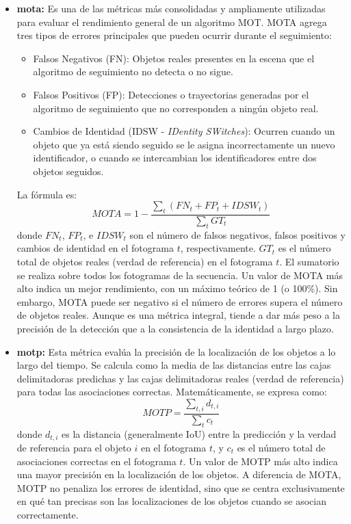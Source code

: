 \documentclass[11pt,spanish,listoffigures,listoftables]{tfgetsinf}
\begin{document}
\begin{itemize}
   \item \textbf{\gls{mota}\cite{4479472}:} Es una de las métricas más consolidadas y ampliamente utilizadas para evaluar el rendimiento general de un algoritmo MOT. MOTA agrega tres tipos de errores principales que pueden ocurrir durante el seguimiento:
   \begin{itemize}
     \item Falsos Negativos (FN): Objetos reales presentes en la escena que el algoritmo de seguimiento no detecta o no sigue.
     \item Falsos Positivos (FP): Detecciones o trayectorias generadas por el algoritmo de seguimiento que no corresponden a ningún objeto real.
     \item Cambios de Identidad (IDSW - \textit{IDentity SWitches}): Ocurren cuando un objeto que ya está siendo seguido se le asigna incorrectamente un nuevo identificador, o cuando se intercambian los identificadores entre dos objetos seguidos.
   \end{itemize}
   La fórmula es:
   \begin{equation}
   MOTA = 1 - \frac{\sum_{t} (FN_t + FP_t + IDSW_t)}{\sum_{t} GT_t}
   \end{equation}
   donde \(FN_t\), \(FP_t\), e \(IDSW_t\) son el número de falsos negativos, falsos positivos y cambios de identidad en el fotograma \(t\), respectivamente. \(GT_t\) es el número total de objetos reales (verdad de referencia) en el fotograma \(t\). El sumatorio se realiza sobre todos los fotogramas de la secuencia.
   Un valor de MOTA más alto indica un mejor rendimiento, con un máximo teórico de 1 (o 100\%). Sin embargo, MOTA puede ser negativo si el número de errores supera el número de objetos reales. Aunque es una métrica integral, tiende a dar más peso a la precisión de la detección que a la consistencia de la identidad a largo plazo.

   \item \textbf{\gls{motp}\cite{4479472}:} Esta métrica evalúa la precisión de la localización de los objetos a lo largo del tiempo. Se calcula como la media de las distancias entre las cajas delimitadoras predichas y las cajas delimitadoras reales (verdad de referencia) para todas las asociaciones correctas. Matemáticamente, se expresa como:
   \begin{equation}
   MOTP = \frac{\sum_{t,i} d_{t,i}}{\sum_{t} c_t}
   \end{equation}
   donde $d_{t,i}$ es la distancia (generalmente IoU) entre la predicción y la verdad de referencia para el objeto $i$ en el fotograma $t$, y $c_t$ es el número total de asociaciones correctas en el fotograma $t$. Un valor de MOTP más alto indica una mayor precisión en la localización de los objetos. A diferencia de MOTA, MOTP no penaliza los errores de identidad, sino que se centra exclusivamente en qué tan precisas son las localizaciones de los objetos cuando se asocian correctamente.


\end{itemize}
\end{document}
